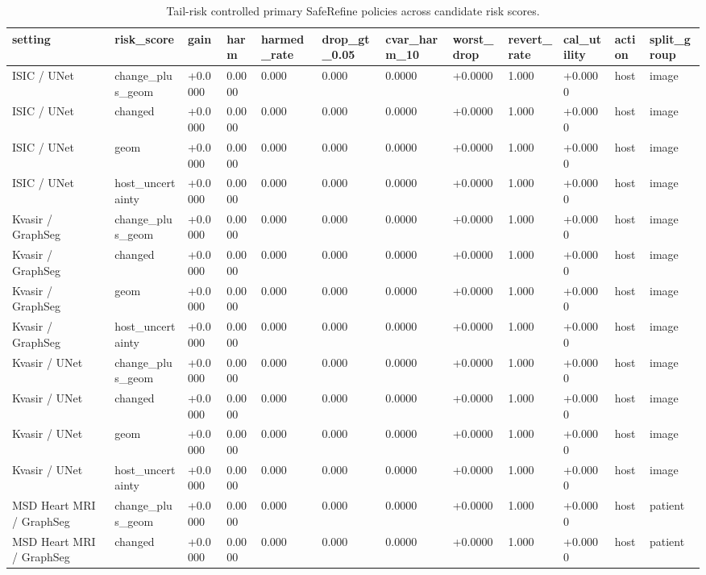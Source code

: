 \begin{table}[t]
\centering
\small
\caption{Tail-risk controlled primary SafeRefine policies across candidate risk scores.}
\label{tab:tail_risk_primary_all}
\begin{tabular}{llllllllllll}
\toprule
setting & risk\_score & gain & harm & harmed\_rate & drop\_gt\_0.05 & cvar\_harm\_10 & worst\_drop & revert\_rate & cal\_utility & action & split\_group \\
\midrule
ISIC / UNet & change\_plus\_geom & +0.0000 & 0.0000 & 0.000 & 0.000 & 0.0000 & +0.0000 & 1.000 & +0.0000 & host & image \\
ISIC / UNet & changed & +0.0000 & 0.0000 & 0.000 & 0.000 & 0.0000 & +0.0000 & 1.000 & +0.0000 & host & image \\
ISIC / UNet & geom & +0.0000 & 0.0000 & 0.000 & 0.000 & 0.0000 & +0.0000 & 1.000 & +0.0000 & host & image \\
ISIC / UNet & host\_uncertainty & +0.0000 & 0.0000 & 0.000 & 0.000 & 0.0000 & +0.0000 & 1.000 & +0.0000 & host & image \\
Kvasir / GraphSeg & change\_plus\_geom & +0.0000 & 0.0000 & 0.000 & 0.000 & 0.0000 & +0.0000 & 1.000 & +0.0000 & host & image \\
Kvasir / GraphSeg & changed & +0.0000 & 0.0000 & 0.000 & 0.000 & 0.0000 & +0.0000 & 1.000 & +0.0000 & host & image \\
Kvasir / GraphSeg & geom & +0.0000 & 0.0000 & 0.000 & 0.000 & 0.0000 & +0.0000 & 1.000 & +0.0000 & host & image \\
Kvasir / GraphSeg & host\_uncertainty & +0.0000 & 0.0000 & 0.000 & 0.000 & 0.0000 & +0.0000 & 1.000 & +0.0000 & host & image \\
Kvasir / UNet & change\_plus\_geom & +0.0000 & 0.0000 & 0.000 & 0.000 & 0.0000 & +0.0000 & 1.000 & +0.0000 & host & image \\
Kvasir / UNet & changed & +0.0000 & 0.0000 & 0.000 & 0.000 & 0.0000 & +0.0000 & 1.000 & +0.0000 & host & image \\
Kvasir / UNet & geom & +0.0000 & 0.0000 & 0.000 & 0.000 & 0.0000 & +0.0000 & 1.000 & +0.0000 & host & image \\
Kvasir / UNet & host\_uncertainty & +0.0000 & 0.0000 & 0.000 & 0.000 & 0.0000 & +0.0000 & 1.000 & +0.0000 & host & image \\
MSD Heart MRI / GraphSeg & change\_plus\_geom & +0.0000 & 0.0000 & 0.000 & 0.000 & 0.0000 & +0.0000 & 1.000 & +0.0000 & host & patient \\
MSD Heart MRI / GraphSeg & changed & +0.0000 & 0.0000 & 0.000 & 0.000 & 0.0000 & +0.0000 & 1.000 & +0.0000 & host & patient \\

\end{tabular}
\end{table}
